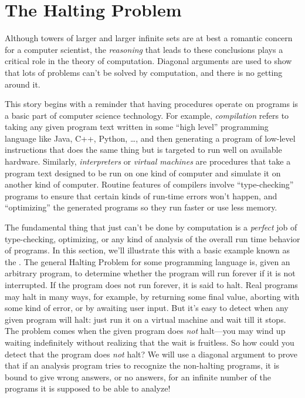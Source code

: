 \section{The Halting Problem}\label{halting_sec}

Although towers of larger and larger infinite sets are at best a
romantic concern for a computer scientist, the \emph{reasoning} that
leads to these conclusions plays a critical role in the theory of
computation.  Diagonal arguments are used to show that lots of
problems can't be solved by computation, and there is no getting
around it.

This story begins with a reminder that having procedures operate on
programs is a basic part of computer science technology.  For example,
\emph{compilation} refers to taking any given program text
written in some ``high level'' programming language like Java, C++,
Python, \dots, and then generating a program of low-level instructions
that does the same thing but is targeted to run well on available
hardware.  Similarly, \emph{interpreters} or \emph{virtual
    machines} are procedures that take a program text designed to be
run on one kind of computer and simulate it on another kind of
computer.  Routine features of compilers involve
``type-checking''%
programs to ensure that certain kinds of
run-time errors won't happen, and ``optimizing'' the generated
programs so they run faster or use less memory.

The fundamental thing that just can't be done by
computation is a \emph{perfect} job of type-checking, optimizing, or
any kind of analysis of the overall run time behavior of programs.  In
this section, we'll illustrate this with a basic example known as the
.  The general Halting Problem for some
programming language is, given an arbitrary program, to determine whether
the program will run forever if it is not interrupted.  If the program
does not run forever, it is said to halt.  Real programs may
halt in many ways, for example, by returning some final value,
aborting with some kind of error, or by awaiting user input.  But it's
easy to detect when any given program will halt: just run it on a
virtual machine and wait till it stops.  The problem comes when the
given program does \emph{not} halt---you may wind up waiting
indefinitely without realizing that the wait is fruitless.  So how
could you detect that the program does \emph{not} halt?  We will use a
diagonal argument to prove that if an analysis program tries to
recognize the non-halting programs, it is bound to give wrong answers,
or no answers, for an infinite number of the programs it is supposed to be
able to analyze!

